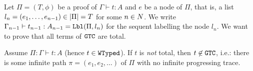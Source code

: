 
Let $\Pi=(T,\phi)$ be a proof of $\Gamma\vdash t:A$ and $e$ be a node of $\Pi$, that is, a list  
$l_n=(e_1, \ldots, e_{n-1}) \in {|\Pi|} = T$ for some $n \in {N}$.
We write $\Gamma_{n-1}\vdash t_{n-1}:A_{n-1} = {\tt Lbl}(\Pi,l_n)$ for the sequent
 labelling the node $l_n$. We want to prove that all terms of ${\tt GTC}$ are total.

\begin{theorem}
  Assume $\Pi:\Gamma\vdash t:A$ (hence $t\in {\tt WTyped}$).
  If $t$ is \emph{not} total, then $t \not \in {\tt GTC}$, i.e.:
  there is some infinite path $\pi = (e_1, e_2, \ldots)$ of $\Pi$ with no infinite progressing trace. 
\end{theorem}


